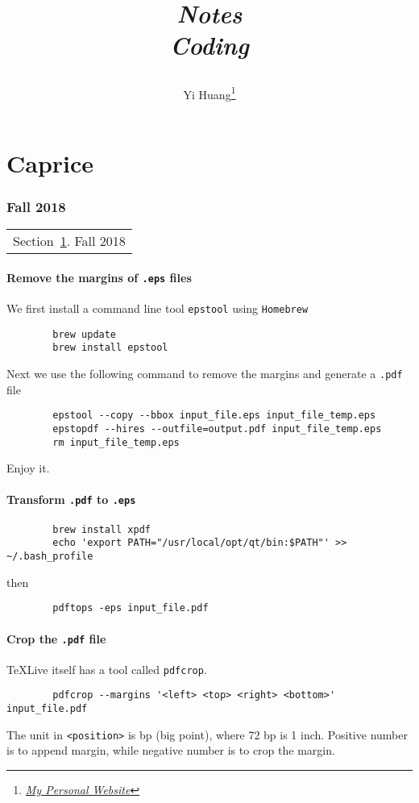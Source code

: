 \documentclass[10pt]{article}
\title{\begin{center}{\Huge \textit{Notes}}\\{{\itshape Coding}}\end{center}}
\author{Yi Huang\footnote{\href{https://yiihuang.com/}{\textit{My Personal Website}}}}
\affiliation{
University of Minnesota
}
\begin{document}
	\maketitle
	\flushbottom
	\newpage
	\pagestyle{fancynotes}
	\part{Caprice}
	\section{Fall 2018}\label{sec:fall2018}
	\begin{margintable}\vspace{.8in}\footnotesize
		\begin{tabularx}{\marginparwidth}{|X}
		Section~\ref{sec:fall2018}. Fall 2018\\
		\end{tabularx}
	\end{margintable}

	\subsection{Remove the margins of \texttt{.eps} files}

	We first install a command line tool \texttt{epstool} using \texttt{Homebrew}
	\begin{verbatim}
		brew update
		brew install epstool
	\end{verbatim}
	Next we use the following command to remove the margins and generate a \texttt{.pdf} file
	\begin{verbatim}
		epstool --copy --bbox input_file.eps input_file_temp.eps
		epstopdf --hires --outfile=output.pdf input_file_temp.eps
		rm input_file_temp.eps
	\end{verbatim}
	Enjoy it.

	\subsection{Transform \texttt{.pdf} to \texttt{.eps}}
	\begin{verbatim}
		brew install xpdf
		echo 'export PATH="/usr/local/opt/qt/bin:$PATH"' >> ~/.bash_profile
	\end{verbatim}
	then 
	\begin{verbatim}
		pdftops -eps input_file.pdf
	\end{verbatim}

	\subsection{Crop the \texttt{.pdf} file}
	TeXLive itself has a tool called \texttt{pdfcrop}.
	\begin{verbatim}
		pdfcrop --margins '<left> <top> <right> <bottom>' input_file.pdf
	\end{verbatim}
	The unit in \texttt{<position>} is bp (big point), where 72 bp is 1 inch. Positive number is to append margin, while negative number is to crop the margin.
\end{document}
